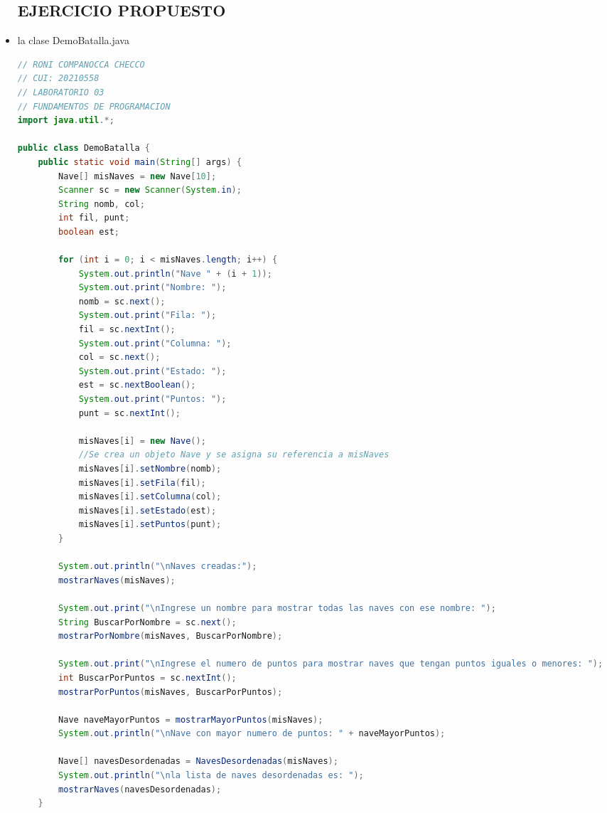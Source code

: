 \documentclass{article}
\begin{document}
\begin{itemize}
        \subsection{EJERCICIO PROPUESTO}
        \item la clase DemoBatalla.java
        \begin{lstlisting}[language=java]
        // RONI COMPANOCCA CHECCO
// CUI: 20210558
// LABORATORIO 03
// FUNDAMENTOS DE PROGRAMACION 
import java.util.*;

public class DemoBatalla {
    public static void main(String[] args) {
        Nave[] misNaves = new Nave[10];
        Scanner sc = new Scanner(System.in);
        String nomb, col;
        int fil, punt;
        boolean est;
        
        for (int i = 0; i < misNaves.length; i++) {
            System.out.println("Nave " + (i + 1));
            System.out.print("Nombre: ");
            nomb = sc.next();
            System.out.print("Fila: ");
            fil = sc.nextInt();
            System.out.print("Columna: ");
            col = sc.next();
            System.out.print("Estado: ");
            est = sc.nextBoolean();
            System.out.print("Puntos: ");
            punt = sc.nextInt();
            
            misNaves[i] = new Nave();
            //Se crea un objeto Nave y se asigna su referencia a misNaves
            misNaves[i].setNombre(nomb);
            misNaves[i].setFila(fil);
            misNaves[i].setColumna(col);
            misNaves[i].setEstado(est);
            misNaves[i].setPuntos(punt);
        }
        
        System.out.println("\nNaves creadas:");
        mostrarNaves(misNaves);
        
        System.out.print("\nIngrese un nombre para mostrar todas las naves con ese nombre: ");
        String BuscarPorNombre = sc.next();
        mostrarPorNombre(misNaves, BuscarPorNombre);
        
        System.out.print("\nIngrese el numero de puntos para mostrar naves que tengan puntos iguales o menores: ");
        int BuscarPorPuntos = sc.nextInt();
        mostrarPorPuntos(misNaves, BuscarPorPuntos);
        
        Nave naveMayorPuntos = mostrarMayorPuntos(misNaves);
        System.out.println("\nNave con mayor numero de puntos: " + naveMayorPuntos);
        
        Nave[] navesDesordenadas = NavesDesordenadas(misNaves);
        System.out.println("\nla lista de naves desordenadas es: ");
        mostrarNaves(navesDesordenadas);
    }
    

\end{lstlisting}
\end{itemize}
\end{document}

